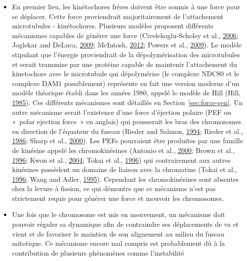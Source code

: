 \documentclass[12pt,a4paper,twoside,openright]{book}
\begin{document}
\begin{itemize}
\item
  En premier lieu, les kinétochores frères doivent être soumis à une
  force pour se déplacer. Cette force proviendrait majoritairement de
  l'attachement microtubules - kinétochores. Plusieurs modèles proposent
  différents mécanismes capables de générer une force
  (Civelekoglu-Scholey et al.,
  \protect\hyperlink{ref-Civelekoglu-Scholey2006}{2006}; Joglekar and
  DeLuca, \protect\hyperlink{ref-Joglekar2009}{2009}; McIntosh,
  \protect\hyperlink{ref-McIntosh2012}{2012}; Powers et al.,
  \protect\hyperlink{ref-Powers2009a}{2009}). Le modèle stipulant que
  l'énergie proviendrait de la dépolymérisation des microtubules et
  serait transmise par une protéine capable de maintenir l'attachement
  du kinetochore avec le microtubule qui dépolymérise (le complexe NDC80
  et le complexe DAM1 possiblement) représente en fait une version
  moderne d'un modèle théorique établi dans les années 1980, appelé le
  modèle de Hill (Hill, \protect\hyperlink{ref-Hill1985}{1985}). Ces
  différents mécanismes sont détaillés en Section~\ref{sec:force-gen}.
  Un autre mécanisme serait l'existence d'une force d'éjection polaire
  (PEF ou «~polar ejection force~» en anglais) qui pousserait les bras
  des chromosomes en direction de l'équateur du fuseau (Rieder and
  Salmon, \protect\hyperlink{ref-Rieder1994a}{1994}; Rieder et al.,
  \protect\hyperlink{ref-Rieder1986}{1986}; Sharp et al.,
  \protect\hyperlink{ref-Sharp2000}{2000}). Les PEFs pourraient être
  produites par une famille de kinésine appelé les chromokinésines
  (Antonio et al., \protect\hyperlink{ref-Antonio2000a}{2000}; Brown et
  al., \protect\hyperlink{ref-Brown1996}{1996}; Kwon et al.,
  \protect\hyperlink{ref-Kwon2004}{2004}; Tokai et al.,
  \protect\hyperlink{ref-Tokai1996a}{1996}) qui contrairement aux autres
  kinésines possèdent un domaine de liaison avec la chromatine (Tokai et
  al., \protect\hyperlink{ref-Tokai1996a}{1996}; Wang and Adler,
  \protect\hyperlink{ref-Wang1995}{1995}). Cependant les chromokinésines
  sont absentes chez la levure à fission, ce qui démontre que ce
  mécanisme n'est pas strictement requis pour générer une force et
  mouvoir les chromosomes.
\item
  Une fois que le chromosome est mis en mouvement, un mécanisme doit
  pouvoir réguler sa dynamique afin de contraindre ses déplacements de
  va et vient et de favoriser le maintien de son alignement au milieu du
  fuseau mitotique. Ce mécanisme encore mal compris est probablement dû
  à la contribution de plusieurs phénomènes comme l'instabilité

\end{itemize}
\end{document}
